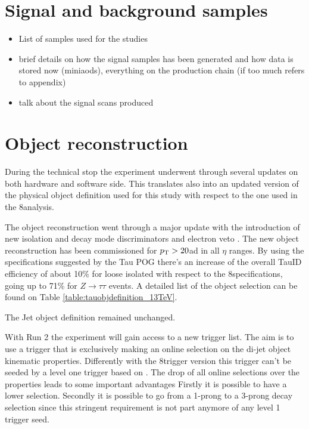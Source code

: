 

\section{Signal and background samples}
\label{sec::samples_13tev}
\begin{itemize}
	\item List of samples used for the studies
	\item brief details on how the signal samples has been generated and how data is stored now (miniaods), everything on the production chain (if too much refers to appendix)
	\item talk about the signal scans produced
\end{itemize}



\section{Object reconstruction}

During the technical stop the experiment underwent through several updates on both hardware and software side. This	translates also into an updated version of the physical object definition used for this study with respect to the one used in the 8\tev analysis.

The \hadtau object reconstruction went through a major update with the introduction of new isolation and decay mode discriminators and electron veto \cite{bib:TauID_13tev}. The new \hadtau object reconstruction has been commissioned for $p_{\text{T}} > 20$\gev ad in all $\eta$ ranges. By using the specifications suggested by the Tau POG there's an increase of the overall TauID efficiency of about 10\% for loose isolated \hadtau with respect to the 8\tev specifications, going up to 71\% for $Z \longrightarrow\tau\tau$ events\cite{bib:TauID_13tev}. A detailed list of the \hadtau object selection can be found on Table \ref{table:tauobjdefinition_13TeV}. 

The Jet object definition remained unchanged.  

With Run 2 the experiment will gain access to a new trigger list. The aim is to use a trigger that is exclusively making an online selection on the di-jet object kinematic properties. Differently with the 8\tev trigger version this trigger can't be seeded by a level one trigger based on \met. The drop of all online selections over the \hadtau properties leads to some important advantages Firstly it is possible to have a lower \hadtau \pt selection. Secondly it is possible to go from a 1-prong to a 3-prong decay selection since this stringent requirement is not part anymore of any level 1 trigger seed. 

